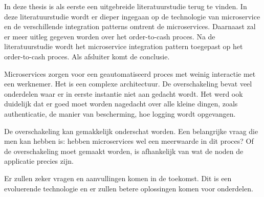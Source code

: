 In deze thesis is als eerste een uitgebreide literatuurstudie terug te vinden. In deze literatuurstudie wordt er dieper ingegaan op de technologie van microservice en de verschillende integration patterns omtrent de microservices. Daarnaast zal er meer uitleg gegeven worden over het order-to-cash proces.
Na de literatuurstudie wordt het microservice integration pattern toegepast op het order-to-cash proces. Als afsluiter komt de conclusie.

Microservices zorgen voor een geautomatiseerd proces met weinig interactie met een werknemer. Het is een complexe architectuur. De overschakeling bevat veel onderdelen waar er in eerste instantie niet aan gedacht wordt. Het werd ook duidelijk dat er goed moet worden nagedacht over alle kleine dingen, zoals authenticatie, de manier van bescherming, hoe logging wordt opgevangen. 

De overschakeling kan gemakkelijk onderschat worden.
Een belangrijke vraag die men kan hebben is: hebben microservices wel een meerwaarde in dit proces? Of de overschakeling moet gemaakt worden, is afhankelijk van wat de noden de applicatie precies zijn.

Er zullen zeker vragen en aanvullingen komen in de toekomst. Dit is een evoluerende technologie en er zullen betere oplossingen komen voor onderdelen.